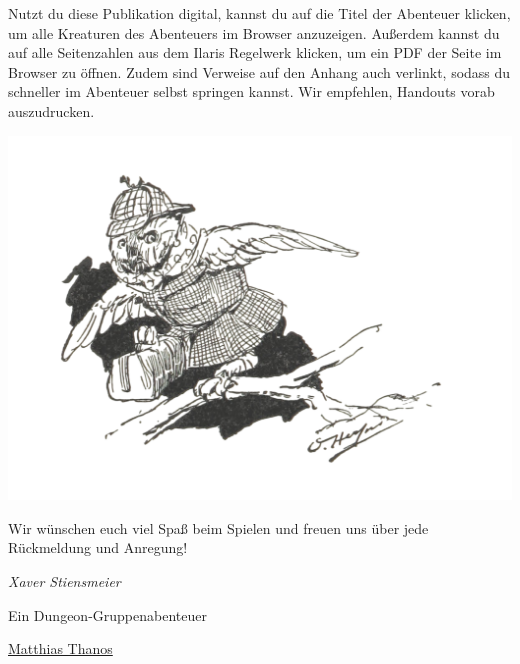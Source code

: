 \documentclass[openright]{Ilaris}
\begin{document}
Nutzt du diese Publikation digital, kannst du auf die Titel der Abenteuer klicken, um alle Kreaturen des Abenteuers im Browser anzuzeigen. Außerdem kannst du auf alle Seitenzahlen aus dem Ilaris Regelwerk klicken, um ein PDF der Seite im Browser zu öffnen. Zudem sind Verweise auf den Anhang auch verlinkt, sodass du schneller im Abenteuer selbst springen kannst. Wir empfehlen, Handouts vorab auszudrucken.
\vfill
\begin{center}
\includegraphics[width=0.8\linewidth]{offene_lizenz/owl_nb}
\end{center}

Wir wünschen euch viel Spaß beim Spielen und freuen uns über jede Rückmeldung und Anregung!

\bigskip

\textsl{Xaver Stiensmeier}



\spaltenende




\thispagestyle{empty}

\begin{center}
	Ein Dungeon-Gruppenabenteuer
	
	\vfill
{}
\vfill	
	
{\href{mailto:matthias.thanos@gmx.de}{Matthias Thanos}}
	\normalfont\normalcolor\normalsize
\end{center}
	
\end{document}
